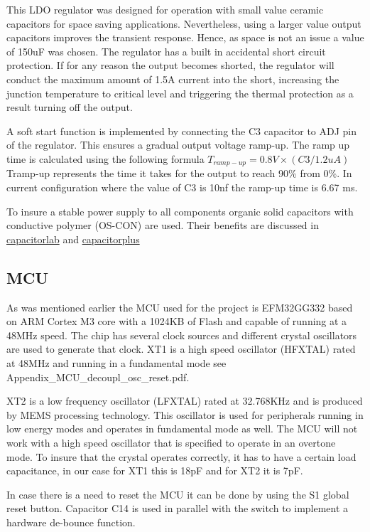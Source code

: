 This LDO regulator was designed for operation with small value ceramic capacitors for space saving applications. Nevertheless, using a larger value output capacitors improves the transient response. Hence, as space is not an issue a value of 150uF was chosen. The regulator has a built in accidental short circuit protection. If for any reason the output becomes shorted, the regulator will conduct the maximum amount of 1.5A current into the short, increasing the junction temperature to critical level and triggering the thermal protection as a result turning off the output. 

A soft start function is implemented by connecting the C3 capacitor to ADJ pin of the regulator. This ensures a gradual output voltage ramp-up. The ramp up time is calculated using the following formula $T_{ramp-up} = 0.8V × (C3/1.2uA)$ Tramp-up represents the time it takes for the output to reach 90\% from 0\%. In current configuration where the value of C3 is 10nf the ramp-up time is 6.67 ms.

To insure a stable power supply to all components organic solid capacitors with conductive polymer (OS-CON) are used. Their benefits are discussed in 
\href{http://www.capacitorlab.com/capacitor-types-polymer/}{capacitorlab}  and  \href{http://www.capacitorsplus.com/whatis.htm}{capacitorplus}


\subsection{MCU}
As was mentioned earlier the MCU used for the project is EFM32GG332 based on ARM Cortex M3 core with a 1024KB of Flash and capable of running at a 48MHz speed. The chip has several clock sources and different crystal oscillators are used to generate that clock. XT1 is a high speed oscillator (HFXTAL) rated at 48MHz and running in a fundamental mode \TODO{}see Appendix\_MCU\_decoupl\_osc\_reset.pdf. 

XT2 is a low frequency oscillator (LFXTAL) rated at 32.768KHz and is produced by MEMS processing technology. This oscillator is used for peripherals running in low energy modes and operates in fundamental mode as well. The MCU will not work with a high speed oscillator that is specified to operate in an overtone mode. To insure that the crystal operates correctly, it has to have a certain load capacitance, in our case for XT1 this is 18pF and for XT2 it is 7pF. 

In case there is a need to reset the MCU it can be done by using the S1 global reset button. Capacitor C14 is used in parallel with the switch to implement a hardware de-bounce function. 

